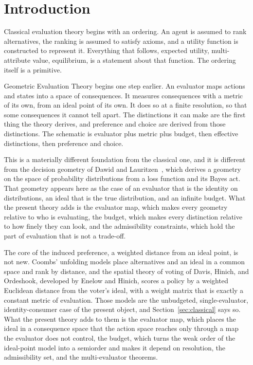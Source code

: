 \documentclass[11pt]{article}
\theoremstyle{definition}
\theoremstyle{remark}
\begin{document}
\section{Introduction}

Classical evaluation theory begins with an ordering.
An agent is assumed to rank alternatives, the ranking is assumed to satisfy axioms, and a utility function is constructed to represent it.
Everything that follows, expected utility, multi-attribute value, equilibrium, is a statement about that function.
The ordering itself is a primitive.

Geometric Evaluation Theory begins one step earlier.
An evaluator maps actions and states into a space of consequences.
It measures consequences with a metric of its own, from an ideal point of its own.
It does so at a finite resolution, so that some consequences it cannot tell apart.
The distinctions it can make are the first thing the theory derives, and preference and choice are derived from those distinctions.
The schematic is evaluator plus metric plus budget, then effective distinctions, then preference and choice.

This is a materially different foundation from the classical one, and it is different from the decision geometry of Dawid and Lauritzen~\cite{dawid2005,dawid2007}, which derives a geometry on the space of probability distributions from a loss function and its Bayes act.
That geometry appears here as the case of an evaluator that is the identity on distributions, an ideal that is the true distribution, and an infinite budget.
What the present theory adds is the evaluator map, which makes every geometry relative to who is evaluating, the budget, which makes every distinction relative to how finely they can look, and the admissibility constraints, which hold the part of evaluation that is not a trade-off.

The core of the induced preference, a weighted distance from an ideal point, is not new.
Coombs' unfolding models place alternatives and an ideal in a common space and rank by distance, and the spatial theory of voting of Davis, Hinich, and Ordeshook, developed by Enelow and Hinich, scores a policy by a weighted Euclidean distance from the voter's ideal, with a weight matrix that is exactly a constant metric of evaluation.
Those models are the unbudgeted, single-evaluator, identity-consumer case of the present object, and Section~\ref{sec:classical} says so.
What the present theory adds to them is the evaluator map, which places the ideal in a consequence space that the action space reaches only through a map the evaluator does not control, the budget, which turns the weak order of the ideal-point model into a semiorder and makes it depend on resolution, the admissibility set, and the multi-evaluator theorems.
\end{document}
